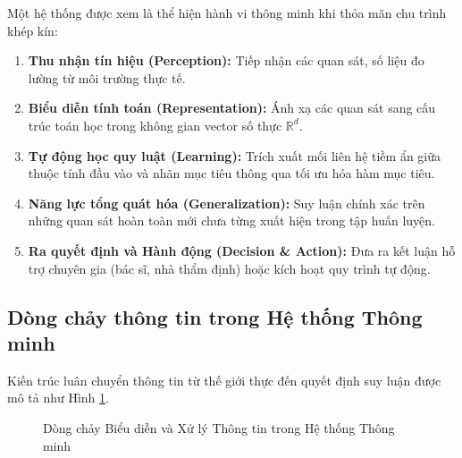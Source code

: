 \documentclass[12pt,a4paper]{report}
\begin{document}
Một hệ thống được xem là thể hiện hành vi thông minh khi thỏa mãn chu trình khép kín:
\begin{enumerate}[leftmargin=1.5em]
    \item \textbf{Thu nhận tín hiệu (Perception):} Tiếp nhận các quan sát, số liệu đo lường từ môi trường thực tế.
    \item \textbf{Biểu diễn tính toán (Representation):} Ánh xạ các quan sát sang cấu trúc toán học trong không gian vector số thực $\mathbb{R}^d$.
    \item \textbf{Tự động học quy luật (Learning):} Trích xuất mối liên hệ tiềm ẩn giữa thuộc tính đầu vào và nhãn mục tiêu thông qua tối ưu hóa hàm mục tiêu.
    \item \textbf{Năng lực tổng quát hóa (Generalization):} Suy luận chính xác trên những quan sát hoàn toàn mới chưa từng xuất hiện trong tập huấn luyện.
    \item \textbf{Ra quyết định và Hành động (Decision \& Action):} Đưa ra kết luận hỗ trợ chuyên gia (bác sĩ, nhà thẩm định) hoặc kích hoạt quy trình tự động.
\end{enumerate}

\subsection{Dòng chảy thông tin trong Hệ thống Thông minh}
Kiến trúc luân chuyển thông tin từ thế giới thực đến quyết định suy luận được mô tả như Hình \ref{fig:ml_flow}.

\begin{figure}[H]
\centering
{}
\caption{Dòng chảy Biểu diễn và Xử lý Thông tin trong Hệ thống Thông minh}
\label{fig:ml_flow}
\end{figure}
\end{document}
